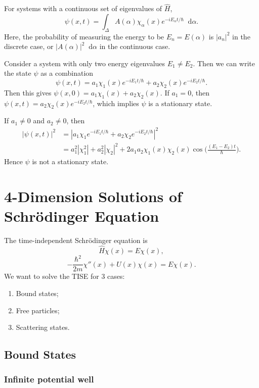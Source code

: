 \documentclass[12pt]{article}
\newcommand{\diff}{\mathop{}\!\mathrm{d}}
\theoremstyle{definition}
\theoremstyle{remark}
\begin{document}
For systems with a continuous set of eigenvalues of $\hat H$,
\[
	\psi(x, t) = \int_{\Delta}A(\alpha)\chi_{\alpha}(x) e^{-iE_{\alpha}t/\hbar} \diff \alpha
.\]
Here, the probability of measuring the energy to be $E_n = E(\alpha)$ is $|a_n|^2$ in the discrete case, or $|A(\alpha)|^2 \diff \alpha$ in the continuous case.

Consider a system with only two energy eigenvalues $E_1 \neq E_2$. Then we can write the state $\psi$ as a combination
\[
	\psi(x, t) = a_1 \chi_1(x) e^{-i E_1 t/\hbar} + a_2 \chi_2(x) e^{-i E_2 t/\hbar}
.\]
Then this gives $\psi(x, 0) = a_1 \chi_1(x) + a_2 \chi_2(x)$. If $a_1 = 0$, then $\psi(x, t) = a_2 \chi_2(x) e^{-i E_2 t/\hbar}$, which implies $\psi$ is a stationary state.

If $a_1 \neq 0$ and $a_2 \neq 0$, then
\begin{align*}
	|\psi(x, t)|^2 &= |a_1 \chi_1 e^{-iE_1 t/\hbar} + a_2 \chi_2 e^{-iE_2 t/\hbar}|^2 \\
		       &= a_1^2|\chi_1^2| + a_2^2|\chi_2|^2 + 2a_1a_2 \chi_1(x)\chi_2(x) \cos \biggl( \frac{(E_1 - E_2)t}{\hbar} \biggr).
\end{align*}
Hence $\psi$ is not a stationary state.
\newpage

\section{4-Dimension Solutions of Schr\"{o}dinger Equation}%
\label{sec:4_dimension_solutions_of_schr"_o_dinger_equation}

The time-independent Schr\"{o}dinger equation is
\[
	\hat H \chi(x) = E \chi(x)
,\]
\[
	- \frac{\hbar^2}{2m}\chi''(x) + U(x) \chi(x) = E \chi(x)
.\]
We want to solve the TISE for 3 cases:
\begin{enumerate}[1.]
	\item Bound states;
	\item Free particles;
	\item Scattering states.
\end{enumerate}

\subsection{Bound States}%
\label{sub:bound_states}

\subsubsection{Infinite potential well}%
\label{subsub:infinite_potential_well}
\end{document}
